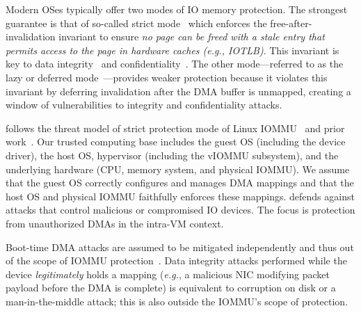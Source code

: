 Modern OSes typically offer two modes of IO memory protection. 
The strongest guarantee is that of so-called strict mode~\cite{nadav2010iommu, Amit2011vIOMMU} 
    which enforces  
    the free-after-invalidation invariant to ensure %
    \emph{no page can be freed with a stale entry 
        that permits access to the page in hardware caches (\textit{e.g.}, IOTLB)}.
This invariant is key to data integrity~\cite{AlexCodeInjection} and confidentiality~\cite{RajapakshaIOMMU}.
The other mode---referred to as the lazy or deferred mode~\cite{RajapakshaIOMMU,AlexCodeInjection}---provides 
    weaker protection because it violates this invariant by
    deferring invalidation after the DMA 
    buffer is unmapped, creating a window of vulnerabilities to integrity and confidentiality attacks.

{\uvmname} follows the threat model of strict protection mode of Linux IOMMU~\cite{nadav2010iommu} and prior work~\cite{markuze2018damn,Amit2011vIOMMU,RajapakshaIOMMU}.
Our trusted computing base includes the guest OS (including the device driver), 
    the host OS, hypervisor (including the vIOMMU subsystem), 
    and the underlying hardware (CPU, memory system, and physical IOMMU).
We assume that the guest OS correctly configures and manages DMA mappings
    and that the host OS and physical IOMMU faithfully enforces these mappings.
{\uvmname} defends against attacks that control malicious or compromised IO devices.
The focus is protection from unauthorized DMAs in the intra-VM context.


Boot-time DMA attacks are assumed to be mitigated independently and 
    thus out of the scope of IOMMU protection~\cite{markuze2018damn}.
Data integrity attacks performed while the device \emph{legitimately} 
    holds a mapping (\textit{e.g.}, a malicious NIC modifying packet payload before the DMA is complete) 
    is equivalent to corruption on disk or a man-in-the-middle attack; 
    this is also outside the IOMMU's scope of protection.

